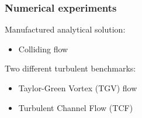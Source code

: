 \begin{frame}[t]
\frametitle{Numerical experiments}
\vfill
Manufactured analytical solution:
\begin{itemize}
\item Colliding flow
\end{itemize}
\vspace{1cm}
Two different turbulent benchmarks:
\begin{itemize}
\item Taylor-Green Vortex (TGV) flow
\item Turbulent Channel Flow (TCF)
\end{itemize}
\vfill
\end{frame}